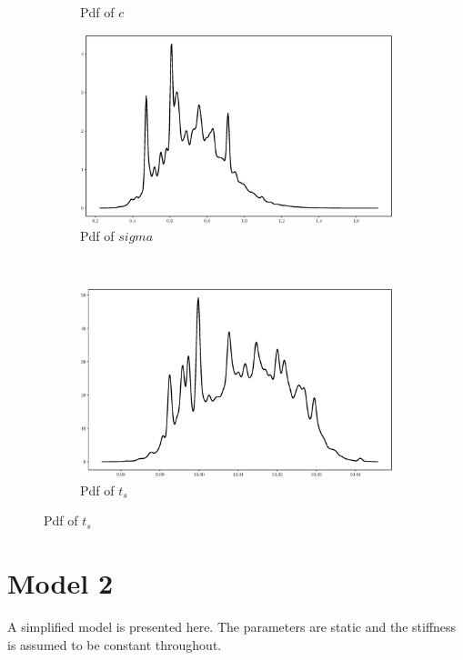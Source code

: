 \documentclass[]{elsarticle}
\begin{document}
\begin{figure}[!htb]
\begin{subfigure}{.49\textwidth}
\caption{Pdf of $c$}
\label{fig:s1c}
\end{subfigure}
\begin{subfigure}{.49\textwidth}
  \centering
\includegraphics[width=\linewidth,keepaspectratio]{./figs/Case00/Model1_sigma.eps}
\caption{Pdf of $sigma$}
\label{fig:s1d}
\end{subfigure}\\
\begin{subfigure}{.49\textwidth}
  \centering
\includegraphics[width=\linewidth,keepaspectratio]{./figs/Case00/Model1_tsnaps.eps}
\caption{Pdf of $t_s$}
\label{fig:s1d}
\end{subfigure}
\end{figure}


\section*{Model 2}

A simplified model is presented here. The parameters are static and the stiffness is assumed to be constant throughout.
\end{document}
